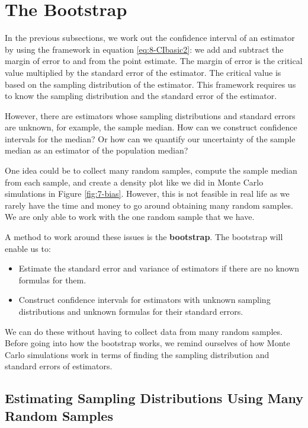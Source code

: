\documentclass[
]{book}
\begin{document}
\hypertarget{bootstrap}{%
\section{The Bootstrap}\label{bootstrap}}

In the previous subsections, we work out the confidence interval of an estimator by using the framework in equation \eqref{eq:8-CIbasic2}: we add and subtract the margin of error to and from the point estimate. The margin of error is the critical value multiplied by the standard error of the estimator. The critical value is based on the sampling distribution of the estimator. This framework requires us to know the sampling distribution and the standard error of the estimator.

However, there are estimators whose sampling distributions and standard errors are unknown, for example, the sample median. How can we construct confidence intervals for the median? Or how can we quantify our uncertainty of the sample median as an estimator of the population median?

One idea could be to collect many random samples, compute the sample median from each sample, and create a density plot like we did in Monte Carlo simulations in Figure \ref{fig:7-bias}. However, this is not feasible in real life as we rarely have the time and money to go around obtaining many random samples. We are only able to work with the one random sample that we have.

A method to work around these issues is the \textbf{bootstrap}. The bootstrap will enable us to:

\begin{itemize}
\item
  Estimate the standard error and variance of estimators if there are no known formulas for them.
\item
  Construct confidence intervals for estimators with unknown sampling distributions and unknown formulas for their standard errors.
\end{itemize}

We can do these without having to collect data from many random samples. Before going into how the bootstrap works, we remind ourselves of how Monte Carlo simulations work in terms of finding the sampling distribution and standard errors of estimators.

\hypertarget{estimating-sampling-distributions-using-many-random-samples}{%
\subsection{Estimating Sampling Distributions Using Many Random Samples}\label{estimating-sampling-distributions-using-many-random-samples}}
\end{document}
